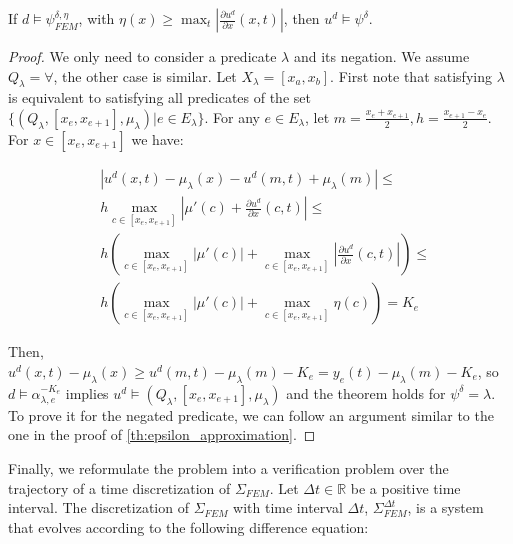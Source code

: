 \documentclass[oribibl]{llncs/llncs}
\newcommand*{\R}{\mathbb{R}}
\begin{document}
\begin{theorem}
\label{th:eta_approximation}
    If $d \models \psi^{\delta, \eta}_{FEM}$, with $\eta(x) \geq \max_t |\frac{\partial
    u^d}{\partial x}(x, t)|$, then $u^d \models \psi^\delta$.
\end{theorem}
\begin{proof}
    We only need to consider a predicate $\lambda$ and its negation. We assume
    $Q_\lambda = \forall$, the other case is similar. Let $X_\lambda = [x_a,
    x_b]$. First note that satisfying $\lambda$ is equivalent to satisfying all
    predicates of the set $\{(Q_\lambda, [x_e, x_{e+1}], \mu_\lambda) | e \in
    E_\lambda\}$. For any $e \in E_\lambda$, let $m = \frac{x_e + x_{e+1}}{2}, 
    h = \frac{x_{e+1} - x_{e}}{2}$. 
    For $x \in [x_e, x_{e+1}]$ we have:

    \begin{equation}
    \begin{aligned}
        &|u^d(x, t) - \mu_\lambda(x) - u^d(m, t) + \mu_\lambda(m)| \leq \\
        &h \max_{c \in [x_e, x_{e+1}]} 
        |\mu'(c) + \frac{\partial u^d}{\partial x}(c, t)|
        \leq \\
        &h \left (  
        \max_{c \in [x_e, x_{e+1}]} |\mu'(c)| +
        \max_{c \in [x_e, x_{e+1}]} |\frac{\partial u^d}{\partial x}(c, t)|
        \right ) \leq \\
        &h \left (  
        \max_{c \in [x_e, x_{e+1}]} |\mu'(c)| +
        \max_{c \in [x_e, x_{e+1}]} \eta(c)
        \right )  = K_e
    \end{aligned}
    \end{equation}

    Then, $u^d(x, t) - \mu_\lambda(x) \geq u^d(m, t) - \mu_\lambda(m) - K_e =
    y_e(t) - \mu_\lambda(m) - K_e$, so $d \models \alpha^{-K_e}_{\lambda, e}$
    implies $u^d \models (Q_\lambda, [x_e, x_{e+1}], \mu_\lambda)$ and the
    theorem holds for $\psi^\delta = \lambda$. To prove it for the negated
    predicate, we can follow an argument similar to the one in the proof of
    \cref{th:epsilon_approximation}.
\end{proof}

Finally, we reformulate the problem into a verification problem over the
trajectory of a time discretization of $\Sigma_{FEM}$. Let $\Delta t \in \R$ be
a positive time interval. The discretization of $\Sigma_{FEM}$ with time
interval $\Delta t$, $\Sigma^{\Delta t}_{FEM}$, is a system that evolves
according to the following difference equation:
\end{document}
